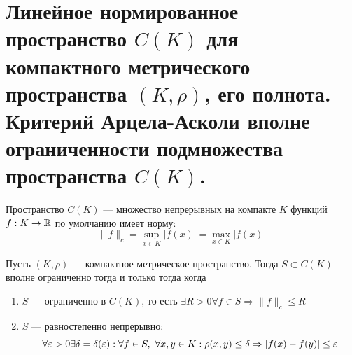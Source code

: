 \newpage
\section{Линейное нормированное пространство $C(K)$ для компактного метрического пространства $(K, \rho)$, его полнота. Критерий Арцела-Асколи вполне ограниченности подмножества пространства $C(K)$.}
\begin{definition}
	Пространство $C(K)$ --- множество непрерывных на компакте $K$ функций $f : K \rightarrow \mathbb{R}$ по умолчанию имеет норму:
	$$
	\|f\|_c  = \sup\limits_{x \in K} |f(x)| = \max\limits_{x \in K}|f(x)|
	$$
\end{definition}
\begin{theorem}\label{th:arzela}
	Пусть $(K, \rho)$ --- компактное метрическое пространство. Тогда $S \subset C(K)$ --- вполне ограниченно тогда и только тогда когда
	\begin{enumerate}
		\item $S$ --- ограниченно в $C(K)$, то есть $\exists R > 0 \forall f \in S \Rightarrow \|f\|_c \leq R$
		\item $S$ --- равностепенно непрерывно: 
		$$
		\forall \varepsilon > 0 \exists \delta = \delta(\varepsilon): \forall f \in S, \ \forall x, y \in K : \rho(x,y) \leq \delta \Rightarrow |f(x) - f(y)| \leq \varepsilon 
		$$
	\end{enumerate}
\end{theorem}

